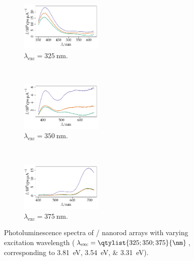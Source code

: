 \documentclass[draft,webedition,openright,titles,swedish,english]{LuaUUThesis}\usepackage[]{graphicx}\usepackage[]{xcolor}
\newenvironment{knitrout}{}{} %
\begin{document}
\begin{figure}[tbp]
\centering
\begin{subfigure}[b]{0.32\textwidth}
\centering
\begin{knitrout}\scriptsize
{}\color{fgcolor}

{\centering \includegraphics[width=1.57in]{figure/0501P-fig-photolum-325-1} 

}


\end{knitrout}
\caption{$\lambda_\text{exc}=\qty{325}{\nm}$.}
\label{fig:P01-photolum-325}
\end{subfigure}%
\,%
\begin{subfigure}[b]{0.32\textwidth}
\centering
\begin{knitrout}\scriptsize
{}\color{fgcolor}

{\centering \includegraphics[width=1.57in]{figure/0501P-fig-photolum-350-1} 

}


\end{knitrout}
\caption{$\lambda_\text{exc}=\qty{350}{\nm}$.}
\label{fig:P01-photolum-350}
\end{subfigure}%
\,%
\begin{subfigure}[b]{0.32\textwidth}
\centering
\begin{knitrout}\scriptsize
{}\color{fgcolor}

{\centering \includegraphics[width=1.57in]{figure/0501P-fig-photolum-375-1} 

}


\end{knitrout}
\caption{$\lambda_\text{exc}=\qty{375}{\nm}$.}
\label{fig:P01-photolum-375}
\end{subfigure}%
\caption[Photoluminescence spectra of ZnO/CdS nanorod arrays]{%
   Photoluminescence spectra of / nanorod arrays with varying
   excitation wavelength ($\lambda_\text{exc}=\qtylist{325;350;375}{\nm}$,
   corresponding to
   \qtylist{3.81;3.54;3.31}{\eV}).}
\label{fig:P01-photolum}
\end{figure}
\end{document}
